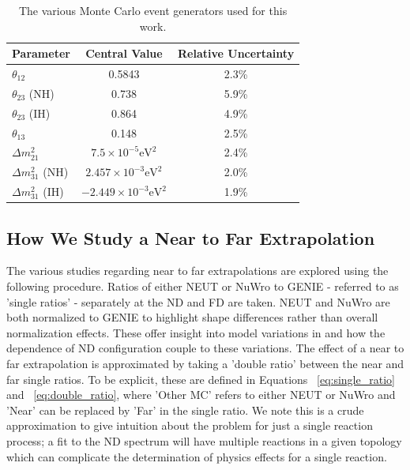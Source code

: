 \documentclass[12pt]{article}
\begin{document}
\begin{table}
\centering
 \begin{tabular}{| l  c  c |} 
 \hline 
 Parameter & Central Value & Relative Uncertainty\\ [0.5ex] 
 \hline
 $\theta_{12}$ & 0.5843 & 2.3\% \\ 
 $\theta_{23}$ (NH) & 0.738 & 5.9\% \\
 $\theta_{23}$ (IH) & 0.864 & 4.9\% \\
 $\theta_{13}$ & 0.148 & 2.5\% \\ 
 $\Delta m^2_{21}$ & $7.5\times10^{-5} \textrm{eV}^2$ & 2.4\% \\
 $\Delta m^2_{31}$ (NH) & $2.457\times10^{-3} \textrm{eV}^2$ & 2.0\% \\
 $\Delta m^2_{31}$ (IH) & $-2.449\times10^{-3} \textrm{eV}^2$ & 1.9\% \\[1ex]
 \hline
\end{tabular}
\caption{The various Monte Carlo event generators used for this work.}
\label{tab:osc}
\end{table}


\FloatBarrier
\subsection{How We Study a Near to Far Extrapolation}
\label{subsec:ntf}
The various studies regarding near to far extrapolations are explored using the following procedure. Ratios of either NEUT or NuWro to GENIE - referred to as 'single ratios' - separately at the ND and FD are taken. NEUT and NuWro are both normalized to GENIE to highlight shape differences rather than overall normalization effects. These offer insight into model variations in and how the dependence of ND configuration couple to these variations.
The effect of a near to far extrapolation is approximated by taking a 'double ratio' between the near and far single ratios. To be explicit, these are defined in Equations ~\ref{eq:single_ratio} and ~\ref{eq:double_ratio}, where 'Other MC' refers to either NEUT or NuWro and 'Near' can be replaced by 'Far' in the single ratio. We note this is a crude approximation to give intuition about the problem for just a single reaction process; a fit to the ND spectrum will have multiple reactions in a given topology which can complicate the determination of physics effects for a single reaction.
\end{document}
